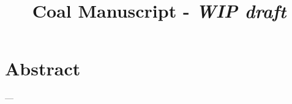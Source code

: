 \documentclass{article}
\title{Coal Manuscript - \textit{WIP draft}}
\author{}
\date{}
\begin{document}
\maketitle



% 
% 
\section*{Abstract}
---















\end{document}
